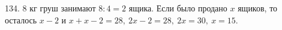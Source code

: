 134. 8 кг груш занимают $8:4=2$ ящика. Если было продано $x$ ящиков, то осталось $x-2$ и $x+x-2=28,\ 2x-2=28,\ 2x=30,\ x=15.$\\
